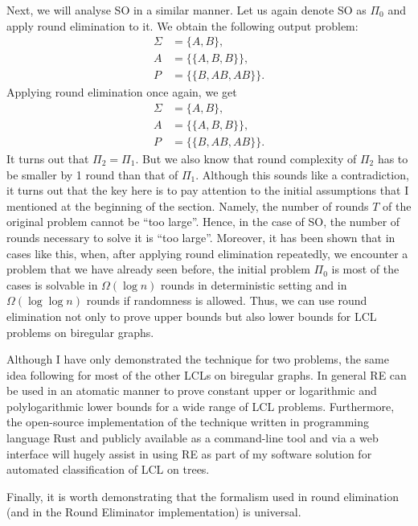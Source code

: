 Next, we will analyse SO in a similar manner. Let us again denote SO as $\Pi_0$ and apply
round elimination to it. We obtain the following output problem:
\begin{align*}
\Sigma &= \{A, B\}, \\
A &= \{ \{A, B, B\} \}, \\
P &= \{ \{B, AB, AB\}\}.
\end{align*}
Applying round elimination once again, we get
\begin{align*}
\Sigma &= \{A, B\}, \\
A &= \{ \{A, B, B\} \}, \\
P &= \{ \{B, AB, AB\}\}.
\end{align*}
It turns out that $\Pi_2 = \Pi_1$. But we also know that round complexity of $\Pi_2$
has to be smaller by 1 round than that of $\Pi_1$. Although this sounds like a contradiction,
it turns out that the key here is to pay attention to the initial assumptions that I mentioned at the
beginning of the section. Namely, the number of rounds $T$ of the original problem cannot be ``too large''.
Hence, in the case of SO, the number of rounds necessary to solve it is ``too large''. Moreover,
it has been shown that in cases like this, when, after applying round elimination repeatedly,
we encounter a problem that we have already seen before, the initial problem $\Pi_0$ is most of the cases
is solvable in $\Omega(\log n)$ rounds in deterministic setting and in $\Omega(\log \log n)$ rounds
if randomness is allowed. Thus, we can use round elimination not only to prove upper bounds but
also lower bounds for LCL problems on biregular graphs.

Although I have only demonstrated the technique for two problems, the same idea following for most of the
other LCLs on biregular graphs. In general RE can be used in an atomatic manner to prove constant upper or
logarithmic and polylogarithmic lower bounds for a wide range of LCL problems. Furthermore, the open-source
implementation
of the technique written in programming language Rust and publicly available as a command-line tool and via
a web interface will hugely assist in using RE as part of my software solution for automated classification
of LCL on trees.

Finally, it is worth demonstrating that the formalism used in round
elimination (and in the Round Eliminator implementation) is universal.

